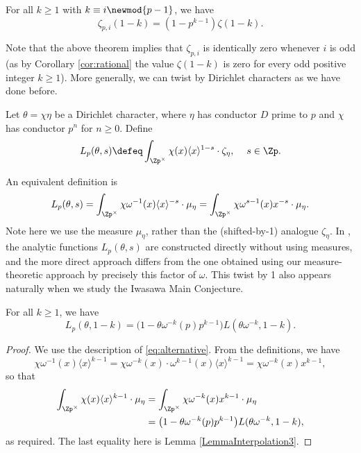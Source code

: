 \documentclass[a4paper,10pt, english, reqno]{smfart}
\numberwithin{equation}{section}
\begin{document}
\begin{theorem} \label{thm:kubota leopoldt analytic}
For all $k\geq 1$ with $k \equiv i \newmod{p-1}$, we have
\[\zeta_{p,i}(1-k) = (1-p^{k-1})\zeta(1-k).\]
\end{theorem}

Note that the above theorem implies that $\zeta_{p, i}$ is identically zero whenever $i$ is odd (as by Corollary \ref{cor:rational} the value $\zeta(1-k)$ is zero for every odd positive integer $k \geq 1$). More generally, we can twist by Dirichlet characters as we have done before.

\begin{definition} \label{DefinitionLp}
Let $\theta = \chi\eta$ be a Dirichlet character, where $\eta$ has conductor $D$ prime to $p$ and $\chi$ has conductor $p^n$ for $n\geq 0$. Define
\[L_p(\theta,s) \defeq \int_{\Zp^\times}\chi(x)\langle x\rangle^{1-s} \cdot \zeta_\eta, \hspace{12pt} s\in\Zp.\]
\end{definition}

\begin{remark}
\item An equivalent definition is  
\begin{equation}\label{eq:alternative}
	L_p(\theta,s) = \int_{\Zp^\times} \chi\omega^{-1}(x)\langle x\rangle^{-s}\cdot \mu_\eta = \int_{\Zp^\times} \chi\omega^{s-1}(x)x^{-s}\cdot \mu_\eta.
\end{equation}
Note here we use the measure $\mu_\eta$, rather than the (shifted-by-1) analogue $\zeta_\eta$. 
In \cite{Washington2}, the analytic functions $L_p(\theta,s)$ are constructed directly without using measures, and the more direct approach differs from the one obtained using our measure-theoretic approach by precisely this factor of $\omega$. This twist by 1 also appears naturally when we study the Iwasawa Main Conjecture.
\end{remark}

\begin{theorem} \label{TheoremLeopoldtAnalyticTwist}
 For all $k\geq 1$, we have
\[L_p(\theta,1-k) = \big(1 - \theta \omega^{-k}(p)p^{k-1}\big) L(\theta \omega^{-k},1-k).\]
\end{theorem}
\begin{proof}
We use the description of \eqref{eq:alternative}. From the definitions, we have \[
    \chi\omega^{-1}(x)\langle x\rangle^{k-1} = \chi\omega^{-k}(x)\cdot\omega^{k-1}(x)\langle x\rangle^{k-1} = \chi\omega^{-k}(x)x^{k-1},
\]
so that
\begin{align*}
\int_{\Zp^\times} \chi(x) \langle x \rangle^{k-1} \cdot \mu_\eta &= \int_{\Zp^\times} \chi \omega^{-k}(x) x^{k-1} \cdot\mu_\eta\\
&= \big( 1 - \theta \omega^{-k}(p) p^{k-1}\big) L(\theta \omega^{-k}, 1-k),
\end{align*}
as required. The last equality here is Lemma \ref{LemmaInterpolation3}.
\end{proof}
\end{document}
